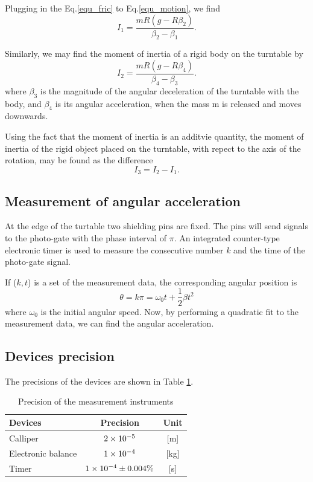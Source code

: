     Plugging in the Eq.\ref{equ_fric} to Eq.\ref{equ_motion}, we find
    \begin{equation}
        I_1=\frac{mR(g-R\beta_2)}{\beta_2-\beta_1}.
    \end{equation}

    Similarly, we may find the moment of inertia of a rigid body on the turntable by
    \begin{equation}
        I_2=\frac{mR(g-R\beta_4)}{\beta_4-\beta_3}.
    \end{equation}
    where $\beta_3$ is the magnitude of the angular deceleration of the turntable with the body, and $\beta_4$ is its angular acceleration, when the mass m is released and moves downwards.

    Using the fact that the moment of inertia is an additvie quantity, the moment of inertia of the rigid object placed on the turntable, with repect to the axis of the rotation, may be found as the difference
    \begin{equation}\label{equ_I}
        I_3=I_2-I_1.
    \end{equation}
    
\subsection{Measurement of angular acceleration}
    At the edge of the turtable two shielding pins are fixed. The pins will send signals to the photo-gate with the phase interval of $\pi$. An integrated counter-type electronic timer is used to measure the consecutive number $k$ and the time of the photo-gate signal.
    
    If ($k,t$) is a set of the measurement data, the corresponding angular position is
    \[
        \theta=k\pi=\omega_0t+\frac{1}{2}\beta t^2
    \]
    where $\omega_0$ is the initial angular speed. Now, by performing a quadratic fit to the measurement data, we can find the angular acceleration.

\subsection{Devices precision}
    The precisions of the devices are shown in Table \ref{precision}.
    \begin{table}[H]
        \centering
        \begin{tabular}{|l|c|c|}
            \hline
            Devices & Precision & Unit\\ \hline
            Calliper & $2\times10^{-5}$ & [m]\\ \hline
            Electronic balance & $1\times10^{-4}$ & [kg]\\ \hline
            Timer & $1\times10^{-4}\pm0.004\%$ & [s]\\\hline
        \end{tabular}
        \caption{Precision of the measurement instruments}\label{precision}
    \end{table}